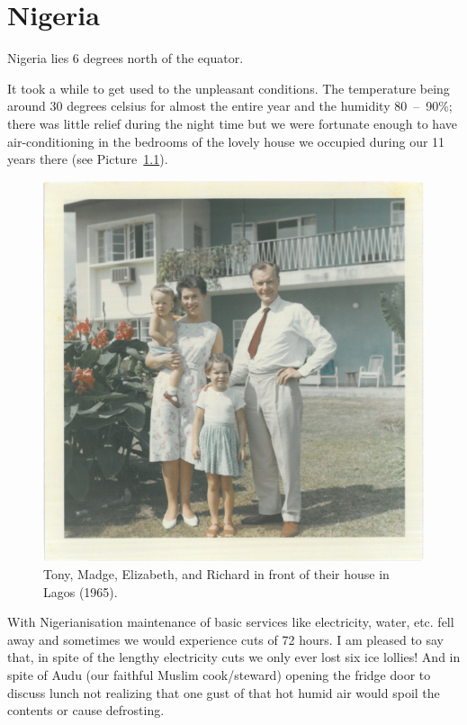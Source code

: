 \chapter{Nigeria}

Nigeria lies 6 degrees north of the equator.

It took a while to get used to the unpleasant conditions. The
temperature being around 30 degrees celsius for almost the entire year
and the humidity 80~--~90\%; there was little relief during the night
time but we were fortunate enough to have air-conditioning in the
bedrooms of the lovely house we occupied during our 11 years there
(see Picture~\ref{family-nigeria}).

\begin{figure}
  \centering
  \includegraphics[width=\textwidth]{photos/family-nigeria.jpg}
  \caption{Tony, Madge, Elizabeth, and Richard in front of their house
  in Lagos (1965).}
  \label{family-nigeria}
\end{figure}

With Nigerianisation maintenance of basic services like electricity,
water, etc. fell away and sometimes we would experience cuts of 72
hours. I am pleased to say that, in spite of the lengthy electricity
cuts we only ever lost six ice lollies! And in spite of Audu (our
faithful Muslim cook/steward) opening the fridge door to discuss lunch
not realizing that one gust of that hot humid air would spoil the
contents or cause defrosting.

